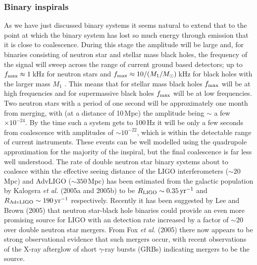 \subsubsection{Binary inspirals}
As we have just discussed binary systems it seems natural to extend that to the point at which
the binary system has lost so much energy through \gw emission that it is close to coalescence.
During this stage the \gw amplitude will be large and, for binaries consisting of neutron star and
stellar mass black holes, the frequency of the signal will sweep across the range of current ground
based detectors; up to $f_{\rm max} \approx 1$\,kHz for neutron stars and $f_{\rm max} \approx
10/(M_1/M_{\odot})$\,kHz for black holes with the larger mass $M_1$ \cite{300Years}. This means that
for stellar mass black holes $f_{\rm max}$ will be at high frequencies and for supermassive black
holes $f_{\rm max}$ will be at low frequencies. Two neutron stars with a period of one second will
be approximately one month from merging, with (at a distance of 10\,Mpc) the \gw amplitude being
$\sim$ a few $\times 10^{-24}$. By the time such a system gets to 100\,Hz it will be only a few
seconds from coalescence with amplitudes of $\sim 10^{-22}$, which is within the detectable range of
current instruments. These events can be well modelled using the quadrupole approximation for the
majority of the inspiral, but the final coalescence is far less well understood. The rate of double
neutron star binary systems about to coalesce within the effective seeing distance of the LIGO
interferometers ($\sim 20$\,Mpc) and AdvLIGO ($\sim 350$\,Mpc) has been estimated from the galactic
population by Kalogera {\it et al.} (2005a and 2005b) \cite{Kalogera:2004a, Kalogera:2004b} to be
$R_{\rm LIGO} \sim 0.35\,{\rm yr}^{-1}$ and $R_{\rm AdvLIGO} \sim 190\,{\rm yr}^{-1}$ respectively.
Recently it has been suggested by Lee and Brown (2005) \cite{Lee:2005} that neutron star-black hole
binaries could provide an even more promising source for LIGO with an detection rate increased by a
factor of $\sim 20$ over double neutron star mergers. From Fox {\it et al.} (2005) \cite{Fox:2005}
there now appears to be strong observational evidence that such mergers occur, with recent
observations of the X-ray afterglow of short $\gamma$-ray bursts (GRBs) indicating mergers to be the
source.

